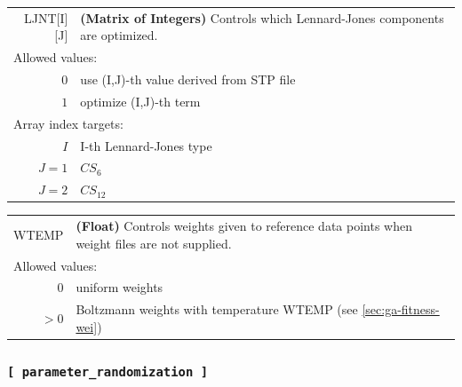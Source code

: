 \documentclass[10pt,a4paper,openany]{memoir}
\numberwithin{equation}{section}
\begin{document}
{
\begin{tabular}{r@{ : }l}
\label{descr:ljnt}
      LJNT[I][J]&\textbf{(Matrix of Integers)} Controls which Lennard-Jones components are optimized.                                               \\ 
\multicolumn{2}{l}{Allowed values:} \\ 
     \(0\)&use (I,J)-th value derived from STP file                                                                         \\ 
     \(1\)&optimize (I,J)-th term                                                                                   \\ 
\multicolumn{2}{l}{Array index targets:} \\ 
     \(I\)& I-th Lennard-Jones type                                                                    \\ 
     \(J=1\)&$CS_6$                                                                                 \\ 
     \(J=2\)&$CS_{12}$                                                                            \\ 
\end{tabular}
\vspace{1ex}
}

{
\begin{tabular}{r@{ : }l}
\label{descr:wtemp}
     WTEMP&\textbf{(Float)} Controls weights given to reference data points when weight files are not supplied. \\ 
\multicolumn{2}{l}{Allowed values:} \\ 
     \(0\)&uniform weights                                                                                      \\ 
    \(>0\)&Boltzmann weights with temperature WTEMP (see \autoref{sec:ga-fitness-wei})                                                            \\ 
\end{tabular}
\vspace{1ex}
}


\subsubsection{\texttt{[~parameter\_randomization~]}}
\label{sec:inp-parameter_randomization}
\end{document}
